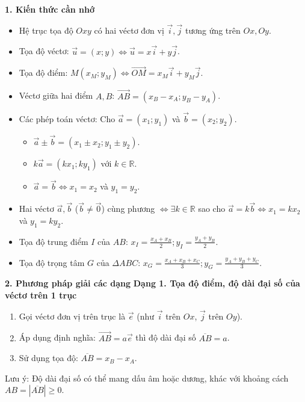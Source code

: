 \par{}\par\smallskip
\textbf{1. Kiến thức cần nhớ}
\begin{itemize}
\item Hệ trục tọa độ $Oxy$ có hai véctơ đơn vị $\overrightarrow{i}, \overrightarrow{j}$ tương ứng trên $Ox, Oy$.
\item Tọa độ véctơ: $\overrightarrow{u} = (x;y) \Leftrightarrow \overrightarrow{u} = x\overrightarrow{i} + y\overrightarrow{j}$.
\item Tọa độ điểm: $M(x_M; y_M) \Leftrightarrow \overrightarrow{OM} = x_M\overrightarrow{i} + y_M\overrightarrow{j}$.
\item Véctơ giữa hai điểm $A, B$: $\overrightarrow{AB} = (x_B - x_A; y_B - y_A)$.
\item Các phép toán véctơ: Cho $\overrightarrow{a} = (x_1; y_1)$ và $\overrightarrow{b} = (x_2; y_2)$.
  \begin{itemize}
  \item $\overrightarrow{a} \pm \overrightarrow{b} = (x_1 \pm x_2; y_1 \pm y_2)$.
  \item $k\overrightarrow{a} = (kx_1; ky_1)$ với $k \in \mathbb{R}$.
  \item $\overrightarrow{a} = \overrightarrow{b} \Leftrightarrow x_1 = x_2$ và $y_1 = y_2$.
  \end{itemize}
\item Hai véctơ $\overrightarrow{a}, \overrightarrow{b}$ ($\overrightarrow{b} \neq \overrightarrow{0}$) cùng phương $\Leftrightarrow \exists k \in \mathbb{R}$ sao cho $\overrightarrow{a} = k\overrightarrow{b} \Leftrightarrow x_1 = k x_2$ và $y_1 = k y_2$.
\item Tọa độ trung điểm $I$ của $AB$: $\boxed{x_I = \frac{x_A + x_B}{2}; y_I = \frac{y_A + y_B}{2}}$.
\item Tọa độ trọng tâm $G$ của $\Delta ABC$: $\boxed{x_G = \frac{x_A + x_B + x_C}{3}; y_G = \frac{y_A + y_B + y_C}{3}}$.
\end{itemize}

\textbf{2. Phương pháp giải các dạng}
\textbf{Dạng 1. Tọa độ điểm, độ dài đại số của véctơ trên 1 trục}
\begin{enumerate}
\item Gọi véctơ đơn vị trên trục là $\overrightarrow{e}$ (như $\overrightarrow{i}$ trên $Ox$, $\overrightarrow{j}$ trên $Oy$).
\item Áp dụng định nghĩa: $\overrightarrow{AB} = a\overrightarrow{e}$ thì độ dài đại số $\overline{AB} = a$.
\item Sử dụng tọa độ: $\overline{AB} = x_B - x_A$.
\end{enumerate}
Lưu ý: Độ dài đại số có thể mang dấu âm hoặc dương, khác với khoảng cách $AB = |\overline{AB}| \ge 0$.

